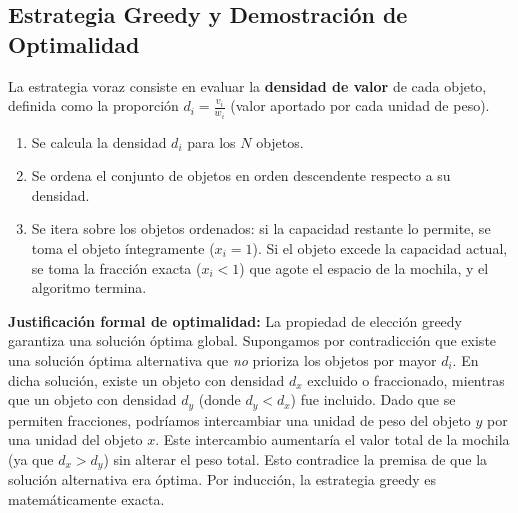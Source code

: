 \documentclass[11pt, a4paper]{article}
\begin{document}
\subsection{Estrategia Greedy y Demostración de Optimalidad}
La estrategia voraz consiste en evaluar la \textbf{densidad de valor} de cada objeto, definida como la proporción $d_i = \frac{v_i}{w_i}$ (valor aportado por cada unidad de peso). 
\begin{enumerate}
    \item Se calcula la densidad $d_i$ para los $N$ objetos.
    \item Se ordena el conjunto de objetos en orden descendente respecto a su densidad.
    \item Se itera sobre los objetos ordenados: si la capacidad restante lo permite, se toma el objeto íntegramente ($x_i = 1$). Si el objeto excede la capacidad actual, se toma la fracción exacta ($x_i < 1$) que agote el espacio de la mochila, y el algoritmo termina.
\end{enumerate}

\textbf{Justificación formal de optimalidad:} La propiedad de elección greedy garantiza una solución óptima global. Supongamos por contradicción que existe una solución óptima alternativa que \textit{no} prioriza los objetos por mayor $d_i$. En dicha solución, existe un objeto con densidad $d_x$ excluido o fraccionado, mientras que un objeto con densidad $d_y$ (donde $d_y < d_x$) fue incluido. Dado que se permiten fracciones, podríamos intercambiar una unidad de peso del objeto $y$ por una unidad del objeto $x$. Este intercambio aumentaría el valor total de la mochila (ya que $d_x > d_y$) sin alterar el peso total. Esto contradice la premisa de que la solución alternativa era óptima. Por inducción, la estrategia greedy es matemáticamente exacta.
\end{document}
